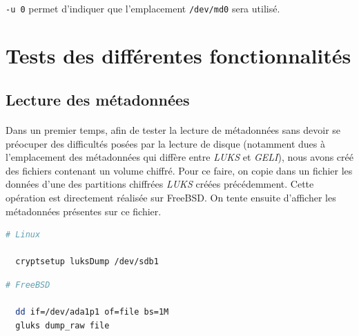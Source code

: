 \paragraph{}
\texttt{-u 0} permet d'indiquer que l'emplacement \texttt{/dev/md0} sera
utilisé.

\section{Tests des différentes fonctionnalités}

\subsection{Lecture des métadonnées}
\paragraph{}
Dans un premier temps, afin de tester la lecture de métadonnées sans devoir se
préocuper des difficultés posées par la lecture de disque (notamment dues à
l'emplacement des métadonnées qui diffère entre \textit{LUKS} et \textit{GELI}),
nous avons créé des fichiers contenant un volume chiffré. Pour ce faire, on
copie dans un fichier les données d'une des partitions chiffrées \textit{LUKS}
créées précédemment. Cette opération est directement réalisée sur FreeBSD. On
tente ensuite d'afficher les métadonnées présentes sur ce fichier.
\\
\begin{lstlisting}[language=bash]
  # Linux

  cryptsetup luksDump /dev/sdb1
\end{lstlisting}
\begin{lstlisting}[language=bash]
  # FreeBSD
  
  dd if=/dev/ada1p1 of=file bs=1M
  gluks dump_raw file
\end{lstlisting}
